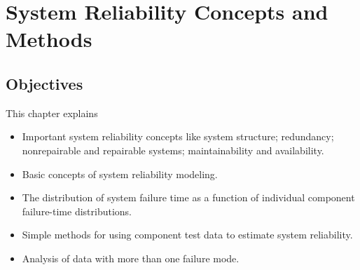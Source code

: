 
\setcounter{chapter}{14}

\chapter{System Reliability Concepts and Methods}
\label{chapter:system.reliability}




\section*{Objectives}
This chapter explains
\begin{itemize} 
\item
Important system reliability concepts like system structure;
redundancy; nonrepairable and repairable systems; maintainability and
availability.
\item
Basic concepts of system reliability modeling.
\item 
The distribution of system failure time as a function of individual
component failure-time distributions.
\item 
Simple methods for using
component test data to estimate system reliability.
\item
Analysis of data with more than one failure mode.
\end{itemize}

